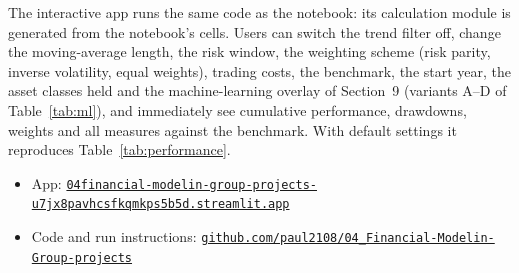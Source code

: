 The interactive app runs the same code as the notebook: its calculation module is generated from the
notebook's cells. Users can switch the trend filter off, change the moving-average length, the risk window, the weighting
scheme (risk parity, inverse volatility, equal weights), trading costs, the benchmark, the start year, the asset classes held and the
machine-learning overlay of Section~9 (variants A--D of Table~\ref{tab:ml}),
and immediately see cumulative performance, drawdowns, weights and all measures against the benchmark. With default settings
it reproduces Table~\ref{tab:performance}.
\begin{itemize}
\item App: \href{\appurl}{\nolinkurl{04financial-modelin-group-projects-u7jx8pavhcsfkqmkps5b5d.streamlit.app}}
\item Code and run instructions: \href{\repourl}{\nolinkurl{github.com/paul2108/04_Financial-Modelin-Group-projects}}
\end{itemize}
